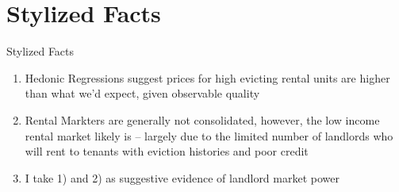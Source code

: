 \documentclass[10pt, xcolor=dvipsnames]{beamer}
\begin{document}
\section{Stylized Facts}

\begin{frame}{Stylized Facts}
    \begin{enumerate}
        \item Hedonic Regressions suggest prices for high evicting rental units are higher than what we'd expect, given observable quality
        \item Rental Markters are generally not consolidated, however, the low income rental market likely is -- largely due to the limited number of landlords who will rent to tenants with eviction histories and poor credit
        \item I take 1) and 2) as suggestive evidence of landlord market power
    \end{enumerate}
\end{frame}

    
\end{document}
